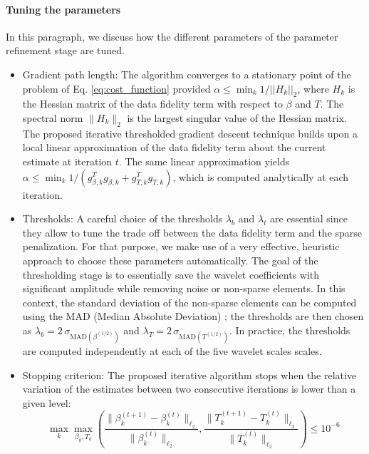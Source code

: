 \documentclass[a4paper,fleqn,usenatbib]{mnras}
\begin{document}
\begin{itemize}
\paragraph{Tuning the parameters}
In this paragraph, we discuss how the different parameters of the parameter refinement stage are tuned.
\begin{itemize}
\item{Gradient path length:} The algorithm converges to a stationary point of the problem of Eq. \ref{eq:cost_function} provided $\alpha \leq  \min_k 1/||H_k||_2$, where $H_k$ is the Hessian matrix of the data fidelity term with respect to $\beta$ and $T$. The spectral norm $\| H_k\|_2$ is the largest singular value of the Hessian matrix. The proposed iterative thresholded gradient descent technique builds upon a local linear approximation of the data fidelity term about the current estimate at iteration $t$. The same linear approximation yields $\alpha \leq  \min_k 1/(g_{\beta,k}^T g_{\beta,k} +g_{T,k}^T g_{T,k})$, which is computed analytically at each iteration.\\

\item{Thresholds:} A careful choice of the thresholds $\lambda_b$ and $\lambda_t$ are essential since they allow to tune the trade off between the data fidelity term and the sparse penalization. For that purpose, we make use of a very effective, heuristic approach to choose these parameters automatically. The goal of the thresholding stage is to essentially save the wavelet coefficients with significant amplitude while removing noise or non-sparse elements. In this context, the standard deviation of the non-sparse elements can be computed using the MAD (Median Absolute Deviation) \citep{starckBook}; the thresholds are then chosen as $\lambda_b = 2\, \sigma_{\mbox{MAD}(\beta^{(1/2)})}$ and $\lambda_T = 2 \, \sigma_{\mbox{MAD}(T^{(1/2)})}$. In practice, the thresholds are computed independently at each of the five wavelet scales scales. \\

\item{Stopping criterion:}	The proposed iterative algorithm stops when the relative variation of the estimates between two consecutive iterations is lower than a given level: 
$$
 \max_k \max_{\beta_k,T_k} \left(  \frac{\|\beta_k^{(t+1)} - \beta_k^{(t)} \|_{\ell_2}}{\|\beta_k^{(t)} \|_{\ell_2}},   \frac{\|T_k^{(t+1)} - T_k^{(t)} \|_{\ell_2}}{\|T_k^{(t)} \|_{\ell_2}}   \right) \leq 10^{-6}
$$
\end{itemize}

\end{itemize}
\end{document}
